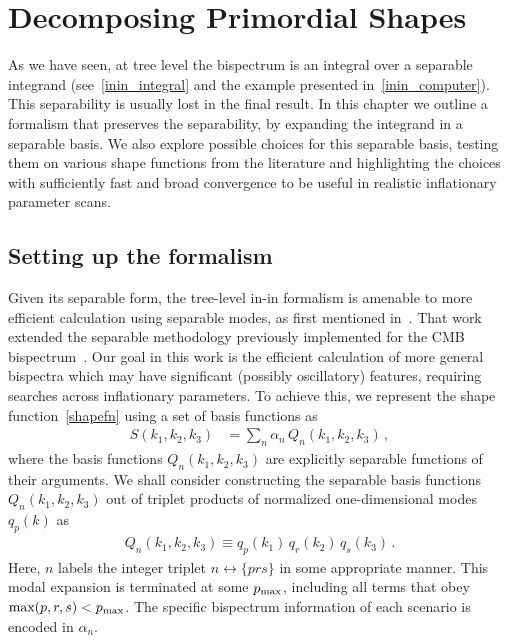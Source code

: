 %
\chapter{Decomposing Primordial Shapes}\label{chapter:decomp}
As we have seen, at tree level the bispectrum is an integral
over a separable integrand (see~\eqref{inin_integral} and
the example presented in~\eqref{inin_computer}).
This separability is usually lost
in the final result. In this chapter we outline a formalism that preserves the
separability, by expanding the integrand in a separable basis. We also explore
possible choices for this separable basis, testing them on various
shape functions from the literature and highlighting the choices with
sufficiently fast and broad convergence to be useful in realistic
inflationary parameter scans.


\section{Setting up the formalism}\label{sec:setting_notation}
Given its separable form, the tree-level in-in formalism is amenable
to more efficient calculation using separable modes, as first mentioned in~\cite{Funakoshi}.
That work extended the separable methodology previously implemented for the CMB
bispectrum~\cite{FergShell_1,FergShell_2,FergShell_3}.
Our goal in this work is the efficient calculation of more general bispectra
which may have significant (possibly oscillatory) features, requiring searches across inflationary parameters.
To achieve this, we represent the shape function~\eqref{shapefn} using a set of basis functions as
\begin{align}\label{goal}
S(k_1, k_2,k_3) &= \sum_n \alpha_n  \, Q_n(k_1,k_2,k_3)\,,
\end{align}
where the basis functions $Q_n(k_1,k_2,k_3)$ are explicitly separable functions of their arguments.
We shall consider constructing the separable basis functions $Q_n(k_1,k_2,k_3)$
out of triplet products of normalized one-dimensional modes $q_p(k)$ as
\begin{align}\label{modes3d}
    Q_n(k_1,k_2,k_3)\equiv q_{p} (k_1) \, q_{r}(k_2)\, q_{s}(k_3)\,.
\end{align}
Here, $n$ labels the integer triplet $n \leftrightarrow \{p r s\}$ in some appropriate manner.
This modal expansion is terminated at some $p_\text{max}$, including all
terms that obey $\text{max}(p,r,s)<p_\text{max}$.
The specific bispectrum information of each scenario is encoded in $\alpha_n$.


